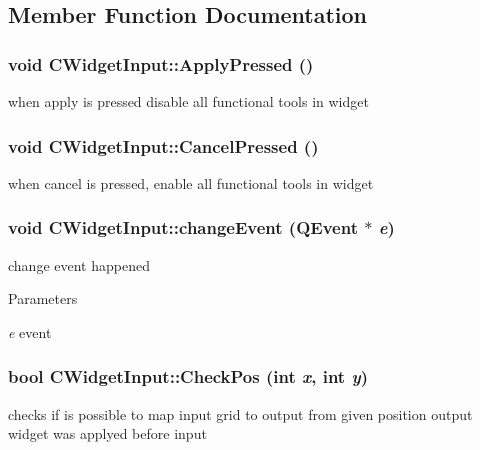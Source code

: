 \subsection{Member Function Documentation}
\hypertarget{classCWidgetInput_ab10814805e99bd5839153a73c6136e6b}{
\subsubsection[{ApplyPressed}]{\setlength{\rightskip}{0pt plus 5cm}void CWidgetInput::ApplyPressed ()}}
\label{classCWidgetInput_ab10814805e99bd5839153a73c6136e6b}
when apply is pressed disable all functional tools in widget \hypertarget{classCWidgetInput_aa721d6a214bb831647927290f79a3d95}{
\subsubsection[{CancelPressed}]{\setlength{\rightskip}{0pt plus 5cm}void CWidgetInput::CancelPressed ()}}
\label{classCWidgetInput_aa721d6a214bb831647927290f79a3d95}
when cancel is pressed, enable all functional tools in widget \hypertarget{classCWidgetInput_a171b7d755f85804e2b87ded2cce69f69}{
\subsubsection[{changeEvent}]{\setlength{\rightskip}{0pt plus 5cm}void CWidgetInput::changeEvent (QEvent $\ast$ {\em e})}}
\label{classCWidgetInput_a171b7d755f85804e2b87ded2cce69f69}
change event happened


\begin{DoxyParams}{Parameters}
\item[{\em e}]event \end{DoxyParams}
\hypertarget{classCWidgetInput_a93f4450ea15aa7db59da2b4534ad7a33}{
\subsubsection[{CheckPos}]{\setlength{\rightskip}{0pt plus 5cm}bool CWidgetInput::CheckPos (int {\em x}, \/  int {\em y})}}
\label{classCWidgetInput_a93f4450ea15aa7db59da2b4534ad7a33}
checks if is possible to map input grid to output from given position output widget was applyed before input


